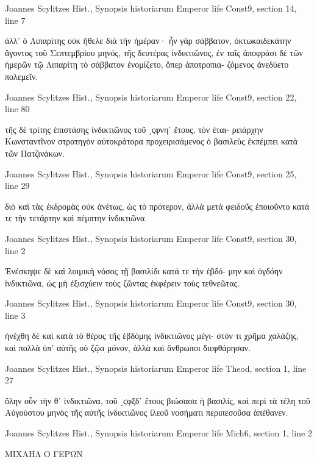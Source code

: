 \documentclass[12pt,letterpaper,twoside,final]{memoir}
\begin{document}
\begin{greek}
Joannes Scylitzes Hist., Synopsis historiarum 
Emperor life Const9, section 14, line 7

                                                         ἀλλ' ὁ Λιπαρίτης οὐκ 
ἤθελε διὰ τὴν ἡμέραν· ἦν γὰρ σάββατον, ὀκτωκαιδεκάτην ἄγοντος τοῦ 
Σεπτεμβρίου μηνός, τῆς δευτέρας ἰνδικτιῶνος, ἐν ταῖς ἀποφράσι δὲ 
τῶν ἡμερῶν τῷ Λιπαρίτῃ τὸ σάββατον ἐνομίζετο, ὅπερ ἀποτροπια-
ζόμενος ἀνεδύετο πολεμεῖν. 



Joannes Scylitzes Hist., Synopsis historiarum 
Emperor life Const9, section 22, line 80

           τῆς δὲ τρίτης ἐπιστάσης ἰνδικτιῶνος τοῦ ͵ϛφνηʹ ἔτους, τὸν ἑται-
ρειάρχην Κωνσταντῖνον στρατηγὸν αὐτοκράτορα προχειρισάμενος ὁ   
βασιλεὺς ἐκπέμπει κατὰ τῶν Πατζινάκων. 



Joannes Scylitzes Hist., Synopsis historiarum 
Emperor life Const9, section 25, line 29

                                                                     διὸ καὶ τὰς 
ἐκδρομὰς οὐκ ἀνέτως, ὡς τὸ πρότερον, ἀλλὰ μετὰ φειδοῦς ἐποιοῦντο 
κατά τε τὴν τετάρτην καὶ πέμπτην ἰνδικτιῶνα. 



Joannes Scylitzes Hist., Synopsis historiarum 
Emperor life Const9, section 30, line 2

Ἐνέσκηψε δὲ καὶ λοιμικὴ νόσος τῇ βασιλίδι κατά τε τὴν ἑβδό-
μην καὶ ὀγδόην ἰνδικτιῶνα, ὡς μὴ ἐξισχύειν τοὺς ζῶντας ἐκφέρειν τοὺς 
τεθνεῶτας. 



Joannes Scylitzes Hist., Synopsis historiarum 
Emperor life Const9, section 30, line 3

            ἠνέχθη δὲ καὶ κατὰ τὸ θέρος τῆς ἑβδόμης ἰνδικτιῶνος μέγι-
στόν τι χρῆμα χαλάζης, καὶ πολλὰ ὑπ' αὐτῆς οὐ ζῷα μόνον, ἀλλὰ 
καὶ ἄνθρωποι διεφθάρησαν. 



Joannes Scylitzes Hist., Synopsis historiarum 
Emperor life Theod, section 1, line 27

               ὅλην οὖν τὴν θʹ ἰνδικτιῶνα, τοῦ ͵ϛφξδʹ ἔτους βιώσασα 
ἡ βασιλίς, καὶ περὶ τὰ τέλη τοῦ Αὐγούστου μηνὸς τῆς αὐτῆς ἰνδικτιῶνος 
ἰλεοῦ νοσήματι περιπεσοῦσα ἀπέθανεν. 



Joannes Scylitzes Hist., Synopsis historiarum 
Emperor life Mich6, section 1, line 2

ΜΙΧΑΗΛ Ο ΓΕΡΩΝ



\end{greek}
\end{document}
